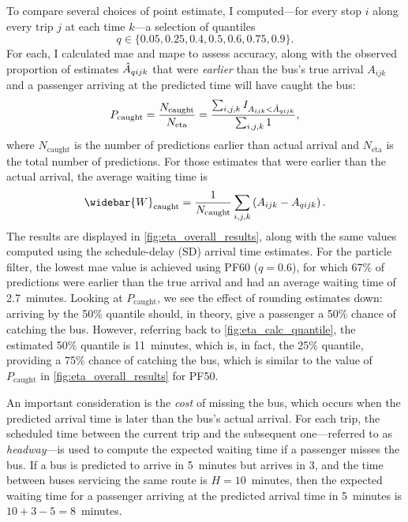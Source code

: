 To compare several choices of point estimate, I computed---for every stop $i$ along every trip $j$ at each time $k$---a selection of quantiles
\[
  q \in \{0.05, 0.25, 0.4, 0.5, 0.6, 0.75, 0.9\}.
\]
For each, I calculated \gls{mae} and \gls{mape} to assess accuracy, along with the observed proportion of estimates $\hat{A}_{qijk}$ that were \emph{earlier} than the bus's true arrival $A_{ijk}$ and a passenger arriving at the predicted time will have caught the bus:
\begin{equation}
\label{eq:pr_bus_caught}
P_\text{caught} = \frac{N_\text{caught}}{N_\text{eta}}
= \frac{\sum_{i,j,k} I_{A_{ijk} < \hat{A}_{qijk}}}{\sum_{i,j,k} 1},
\end{equation}
where $N_\text{caught}$ is the number of predictions earlier than actual arrival and $N_\text{eta}$ is the total number of predictions. For those estimates that were earlier than the actual arrival, the average waiting time is
\begin{equation}
\label{eq:avg_wait_time}
\widebar{W}_\text{caught} =
\frac{1}{N_\text{caught}} \sum_{i,j,k} \left(A_{ijk} - \Teta_{qijk}\right).
\end{equation}
The results are displayed in \cref{fig:eta_overall_results}, along with the same values computed using the schedule-delay (SD) arrival time estimates. For the particle filter, the lowest \gls{mae} value is achieved using PF60 ($q = 0.6$), for which 67\% of predictions were earlier than the true arrival and had an average waiting time of 2.7~minutes. Looking at $P_\text{caught}$, we see the effect of rounding estimates down: arriving by the 50\% quantile should, in theory, give a passenger a 50\% chance of catching the bus. However, referring back to \cref{fig:eta_calc_quantile}, the estimated 50\% quantile is 11~minutes, which is, in fact, the 25\% quantile, providing a 75\% chance of catching the bus, which is similar to the value of $P_\text{caught}$ in \cref{fig:eta_overall_results} for PF50.



An important consideration is the \emph{cost} of missing the bus, which occurs when the predicted arrival time is later than the bus's actual arrival. For each trip, the scheduled time between the current trip and the subsequent one---referred to as \emph{headway}---is used to compute the expected waiting time if a passenger misses the bus. If a bus is predicted to arrive in 5~minutes but arrives in 3, and the time between buses servicing the same route is $H = 10$~minutes, then the expected waiting time for a passenger arriving at the predicted arrival time in 5~minutes is $10+3-5=8$~minutes.


